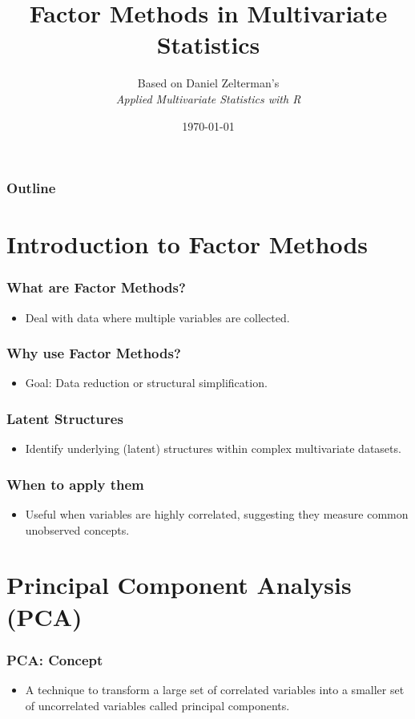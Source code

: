 \documentclass{beamer}
\title{Factor Methods in Multivariate Statistics}
\author{Based on Daniel Zelterman's \\ \textit{Applied Multivariate Statistics with R}}
\date{\today}
\begin{document}
\frame{\titlepage}

\begin{frame}
    \frametitle{Outline}
    \tableofcontents
\end{frame}

\section{Introduction to Factor Methods}

\begin{frame}
    \frametitle{What are Factor Methods?}
    \begin{itemize}
        \item Deal with data where multiple variables are collected.
    \end{itemize}
\end{frame}

\begin{frame}
    \frametitle{Why use Factor Methods?}
    \begin{itemize}
        \item Goal: \alert{Data reduction} or \alert{structural simplification}.
    \end{itemize}
\end{frame}

\begin{frame}
    \frametitle{Latent Structures}
    \begin{itemize}
        \item Identify underlying (latent) structures within complex multivariate datasets.
    \end{itemize}
\end{frame}

\begin{frame}
    \frametitle{When to apply them}
    \begin{itemize}
        \item Useful when variables are highly correlated, suggesting they measure common unobserved concepts.
    \end{itemize}
\end{frame}

\section{Principal Component Analysis (PCA)}

\begin{frame}
    \frametitle{PCA: Concept}
    \begin{itemize}
        \item A technique to transform a large set of correlated variables into a smaller set of uncorrelated variables called \alert{principal components}.
    \end{itemize}
\end{frame}
\end{document}

